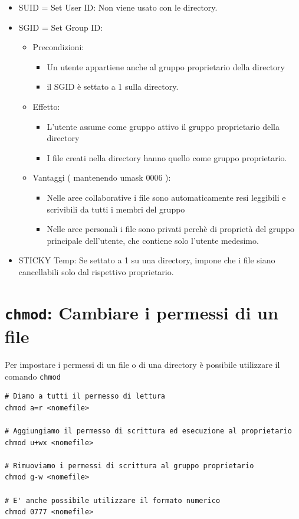 \documentclass[a4paper]{report}
\newenvironment{code}{\begin{tcolorbox}[size=small]}{\end{tcolorbox}}
\begin{document}
\begin{itemize}
	\item SUID = Set User ID: Non viene usato con le directory.
	
	\item SGID = Set Group ID: 
	\begin{itemize}
		\item Precondizioni:
		\begin{itemize}
			\item Un utente appartiene anche al gruppo proprietario della directory
			\item il SGID è settato a 1 sulla directory.
		\end{itemize}
		
		\item Effetto:
		\begin{itemize}
			\item L'utente assume come gruppo attivo il gruppo proprietario della directory
			\item I file creati nella directory hanno quello come gruppo proprietario.
		\end{itemize}
	
		\item Vantaggi ( mantenendo umask 0006 ):
		\begin{itemize}
			\item Nelle aree collaborative i file sono automaticamente resi leggibili e scrivibili da tutti i membri del gruppo
			\item Nelle aree personali i file sono privati perchè di proprietà del gruppo principale dell'utente, che contiene solo l'utente medesimo.
		\end{itemize}
	\end{itemize}
	
	\item STICKY Temp: Se settato a 1 su una directory, impone che i file siano cancellabili solo dal rispettivo proprietario.
\end{itemize}

\section{\texttt{chmod}: Cambiare i permessi di un file}

Per impostare i permessi di un file o di una directory è possibile utilizzare il comando \texttt{chmod}

\begin{code} 
\begin{lstlisting}
# Diamo a tutti il permesso di lettura
chmod a=r <nomefile>

# Aggiungiamo il permesso di scrittura ed esecuzione al proprietario
chmod u+wx <nomefile>

# Rimuoviamo i permessi di scrittura al gruppo proprietario
chmod g-w <nomefile>

# E' anche possibile utilizzare il formato numerico
chmod 0777 <nomefile>
\end{lstlisting}
\end{code}
\end{document}
